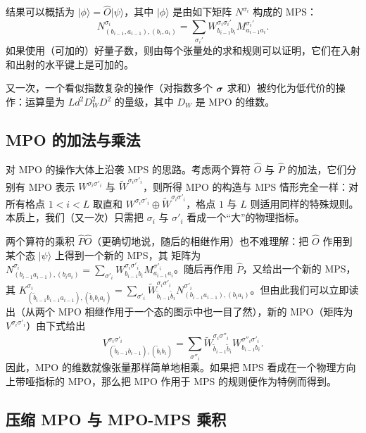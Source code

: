 \documentclass[a4paper,10pt,oneside,onecolumn,1p,times]{elsarticle}
\newcommand{\ket}[1]{\mbox{$| #1  \rangle$}}
\newcommand{\fat}[1]{\mbox{\boldmath$#1$\unboldmath}}	%
\begin{document}
结果可以概括为 $\ket{\phi}=\hat{O}\ket{\psi}$，其中 $\ket{\phi}$ 是由如下矩阵 $N^{\sigma_i}$ 构成的 MPS：
\begin{equation}
N^{\sigma_i}_{(b_{i-1},a_{i-1}),(b_i,a_i)} = \sum_{\sigma_i'} W^{\sigma_i\sigma_i'}_{b_{i-1}b_i} M^{\sigma_i'}_{a_{i-1}a_i} .
\end{equation}
如果使用（可加的）好量子数，则由每个张量处的求和规则可以证明，它们在入射和出射的水平键上是可加的。

又一次，一个看似指数复杂的操作（对指数多个 $\fat{\sigma}$ 求和）被约化为低代价的操作：运算量为
$Ld^2 D_W^2 D^2$ 的量级，其中 $D_W$ 是 MPO 的维数。

\subsection{MPO 的加法与乘法}

对 MPO 的操作大体上沿袭 MPS 的思路。考虑两个算符 $\hat{O}$ 与 $\hat{P}$ 的加法，它们分别有 MPO 表示 $W^{\sigma_i\sigma'_i}$ 与
$\tilde{W}^{\sigma_i\sigma'_i}$，则所得 MPO 的构造与 MPS 情形完全一样：对所有格点 $1 < i < L$ 取直和 $W^{\sigma_i\sigma'_i} \oplus \tilde{W}^{\sigma_i\sigma'_i}$，格点 $1$ 与 $L$ 则适用同样的特殊规则。本质上，我们（又一次）只需把 $\sigma_i$ 与 $\sigma'_i$ 看成一个``大''的物理指标。

两个算符的乘积 $\hat{P} \hat{O}$（更确切地说，随后的相继作用）也不难理解：把 $\hat{O}$ 作用到某个态 $\ket{\psi}$ 上得到一个新的 MPS，其
矩阵为 $N^{\sigma_i}_{(b_{i-1}a_{i-1}),(b_i a_i)} = \sum_{\sigma'_i} W^{\sigma_i\sigma'_i}_{b_{i-1}b_i} M^{\sigma'_i}_{a_{i-1}a_i}$。随后再作用 $\hat{P}$，又给出一个新的 MPS，其 $K^{\sigma_i}_{(\tilde{b}_{i-1}b_{i-1}a_{i-1}),(\tilde{b}_i b_i a_i)} =  \sum_{\sigma'_i} \tilde{W}^{\sigma_i\sigma'_i}_{\tilde{b}_{i-1} \tilde{b}_i} N^{\sigma'_i}_{(b_{i-1}a_{i-1}),(b_i a_i)}$。但由此我们可以立即读出（从两个 MPO 相继作用于一个态的图示中也一目了然），新的 MPO（矩阵为 $V^{\sigma_i\sigma'_i}$）由下式给出
\begin{equation}
V^{\sigma_i\sigma'_i}_{(\tilde{b}_{i-1}b_{i-1}),(\tilde{b}_{i}b_{i})} = \sum_{\sigma''_i} 
\tilde{W}^{\sigma_i\sigma''_i}_{\tilde{b}_{i-1} \tilde{b}_i} W^{\sigma''_i\sigma'_i}_{b_{i-1}b_i} .
\end{equation}
因此，MPO 的维数就像张量那样简单地相乘。如果把 MPS 看成在一个物理方向上带哑指标的 MPO，那么把 MPO 作用于 MPS 的规则便作为特例而得到。
 
\subsection{压缩 MPO 与 MPO-MPS 乘积}
\end{document}
